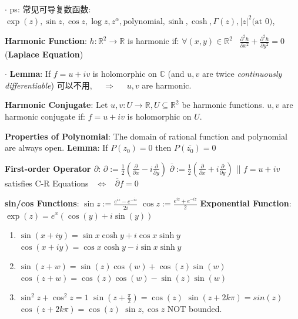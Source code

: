 \documentclass[9pt]{article}
\begin{document}
$\cdot$ {\footnotesize ps: 常见可导复数函数: $\exp(z),\sin z,\cos z,\log z,z^\alpha,\text{polynomial},\sinh,\cosh,\Gamma(z),|z|^2\text{(at 0)}$,} \quad {}

\textbf{Harmonic Function}: $h:\mathbb{R}^2\to\mathbb{R}$ is harmonic if: $\forall(x,y)\in\mathbb{R}^2$ \ $\frac{\partial^2h}{\partial x^2}+\frac{\partial^2h}{\partial y^2}=0$ {\footnotesize (\textbf{Laplace Equation})}

$\cdot$ \textbf{Lemma}: If $f=u+iv$ is holomorphic on $\mathbb{C}$ {\tiny (and $u,v$ are twice \textit{continuously differentiable}) 可以不用}, \ \ $\Rightarrow$ \ \ $u,v$ are harmonic. 

\textbf{Harmonic Conjugate}: {\small Let $u,v:U\to\mathbb{R},U\subseteq\mathbb{R}^2 $ be harmonic functions. $u,v$ are harmonic conjugate if: $f=u+iv$ is holomorphic on $U$.}

\textbf{Properties of Polynomial}: {\small The domain of rational function and polynomial are always open.} \quad \quad \textbf{Lemma}: If $P(z_0)=0$ then $P(\overline{z_0})=0$

\textbf{First-order Operator $\partial$}: $\partial:=\frac{1}{2}\left(\frac{\partial}{\partial x}-i\frac{\partial}{\partial y}\right)$ \quad \quad $\overline{\partial}:=\frac{1}{2}\left(\frac{\partial}{\partial x}+i\frac{\partial}{\partial y}\right)$ \quad || \quad $f=u+iv$ satisfies C-R Equations \ $\Leftrightarrow$ \ $\overline{\partial}f=0$

\textbf{sin/cos Functions}: $\sin z:=\frac{e^{iz}-e^{-iz}}{2i}$ \quad \quad $\cos z:=\frac{e^{iz}+e^{-iz}}{2}$ \quad \quad \textbf{Exponential Function}: $\exp(z)=e^x(\cos(y)+i\sin(y))$

\begin{enumerate}[itemsep=-2pt, topsep=-2pt]
    \item $\sin(x+iy)=\sin x\cosh y+i\cos x\sinh y$ \quad $\cos(x+iy)=\cos x\cosh y-i\sin x\sinh y$
    \item $\sin(z+w)=\sin(z)\cos(w)+\cos(z)\sin(w)$ \quad $\cos(z+w)=\cos(z)\cos(w)-\sin(z)\sin(w)$ 
    \item $\sin^2z+\cos^2z=1$ \quad $\sin(z+\frac{\pi}{2})=\cos(z)$ \quad $\sin(z+2k\pi)=sin(z)$ \quad $\cos(z+2k\pi)=\cos(z)$ \quad \quad \star $\sin z,\cos z$ NOT bounded.
\end{enumerate}
\end{document}
